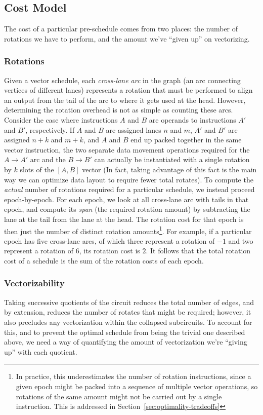 \subsection{Cost Model}\label{sec:cost-model}
The cost of a particular pre-schedule comes from two places: the number of rotations we have to perform, and the amount we've ``given up'' on vectorizing.
\subsubsection*{Rotations}
Given a vector schedule, each {\em cross-lane arc} in the graph (an arc connecting vertices of different lanes) represents a rotation that must be performed to align an output from the tail of the arc to where it gets used at the head.
However, determining the rotation overhead is not as simple as counting these arcs.
Consider the case where instructions $A$ and $B$ are operands to instructions $A'$ and $B'$, respectively.
If $A$ and $B$ are assigned lanes $n$ and $m$, $A'$ and $B'$ are assigned $n+k$ and $m+k$, and $A$ and $B$ end up packed together in the same vector instruction, the two separate data movement operations required for the $A\to A'$ arc and the $B\to B'$ can actually be instantiated with a single rotation by $k$ slots of the $[A, B]$ vector (In fact, taking advantage of this fact is the main way we can optimize data layout to require fewer total rotates). 
To compute the {\em actual} number of rotations required for a particular schedule, we instead proceed epoch-by-epoch. 
For each epoch, we look at all cross-lane arc with tails in that epoch, and compute its {\em span} (the required rotation amount) by subtracting the lane at the tail from the lane at the head.
The rotation cost for that epoch is then just the number of distinct rotation amounts\footnote{In practice, this underestimates the number of rotation instructions, since a given epoch might be packed into a sequence of multiple vector operations, so rotations of the same amount might not be carried out by a single instruction. This is addressed in Section~\ref{sec:optimality-tradeoffs}}.
For example, if a particular epoch has five cross-lane arcs, of which three represent a rotation of $-1$ and two represent a rotation of $6$, its rotation cost is $2$.
It follows that the total rotation cost of a schedule is the sum of the rotation costs of each epoch.

\subsubsection*{Vectorizability}
Taking successive quotients of the circuit reduces the total number of edges, and by extension, reduces the number of rotates that might be required; however, it also precludes any vectorization within the collapsed subcircuits.
To account for this, and to prevent the optimal schedule from being the trivial one described above, we need a way of quantifying the amount of vectorization we're ``giving up'' with each quotient.

